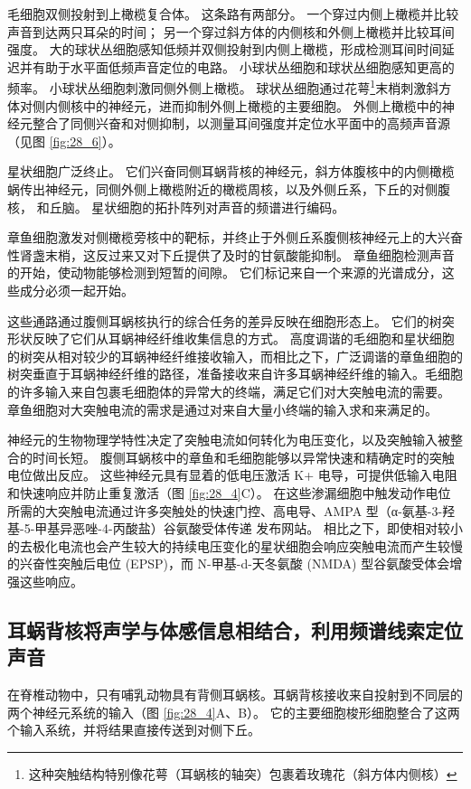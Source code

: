 毛细胞双侧投射到上橄榄复合体。
这条路有两部分。
一个穿过内侧上橄榄并比较声音到达两只耳朵的时间； 另一个穿过斜方体的内侧核和外侧上橄榄并比较耳间强度。
大的球状丛细胞感知低频并双侧投射到内侧上橄榄，形成检测耳间时间延迟并有助于水平面低频声音定位的电路。
小球状丛细胞和球状丛细胞感知更高的频率。
小球状丛细胞刺激同侧外侧上橄榄。
球状丛细胞通过花萼\footnote{这种突触结构特别像花萼（耳蜗核的轴突）包裹着玫瑰花（斜方体内侧核）}末梢刺激斜方体对侧内侧核中的神经元，进而抑制外侧上橄榄的主要细胞。
外侧上橄榄中的神经元整合了同侧兴奋和对侧抑制，以测量耳间强度并定位水平面中的高频声音源（见图 \ref{fig:28_6}）。


星状细胞广泛终止。
它们兴奋同侧耳蜗背核的神经元，斜方体腹核中的内侧橄榄蜗传出神经元，同侧外侧上橄榄附近的橄榄周核，以及外侧丘系，下丘的对侧腹核， 和丘脑。 
星状细胞的拓扑阵列对声音的频谱进行编码。


章鱼细胞激发对侧橄榄旁核中的靶标，并终止于外侧丘系腹侧核神经元上的大兴奋性肾盏末梢，这反过来又对下丘提供了及时的甘氨酸能抑制。
章鱼细胞检测声音的开始，使动物能够检测到短暂的间隙。
它们标记来自一个来源的光谱成分，这些成分必须一起开始。


这些通路通过腹侧耳蜗核执行的综合任务的差异反映在细胞形态上。
它们的树突形状反映了它们从耳蜗神经纤维收集信息的方式。
高度调谐的毛细胞和星状细胞的树突从相对较少的耳蜗神经纤维接收输入，而相比之下，广泛调谐的章鱼细胞的树突垂直于耳蜗神经纤维的路径，准备接收来自许多耳蜗神经纤维的输入。毛细胞的许多输入来自包裹毛细胞体的异常大的终端，满足它们对大突触电流的需要。
章鱼细胞对大突触电流的需求是通过对来自大量小终端的输入求和来满足的。


神经元的生物物理学特性决定了突触电流如何转化为电压变化，以及突触输入被整合的时间长短。
腹侧耳蜗核中的章鱼和毛细胞能够以异常快速和精确定时的突触电位做出反应。
这些神经元具有显着的低电压激活 K+ 电导，可提供低输入电阻和快速响应并防止重复激活（图 \ref{fig:28_4}C）。 
在这些渗漏细胞中触发动作电位所需的大突触电流通过许多突触处的快速门控、高电导、AMPA 型（α-氨基-3-羟基-5-甲基异恶唑-4-丙酸盐）谷氨酸受体传递 发布网站。
相比之下，即使相对较小的去极化电流也会产生较大的持续电压变化的星状细胞会响应突触电流而产生较慢的兴奋性突触后电位 (EPSP)，而 N-甲基-d-天冬氨酸 (NMDA) 型谷氨酸受体会增强这些响应。


\subsection{耳蜗背核将声学与体感信息相结合，利用频谱线索定位声音}

在脊椎动物中，只有哺乳动物具有背侧耳蜗核。耳蜗背核接收来自投射到不同层的两个神经元系统的输入（图 \ref{fig:28_4}A、B）。
它的主要细胞梭形细胞整合了这两个输入系统，并将结果直接传送到对侧下丘。


